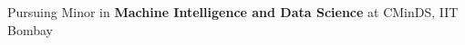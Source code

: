 


\vspace*{50mm}

\noindent Pursuing Minor in \textbf{Machine Intelligence and Data Science} at CMinDS, IIT Bombay

\vspace{-14pt}







\newpage





